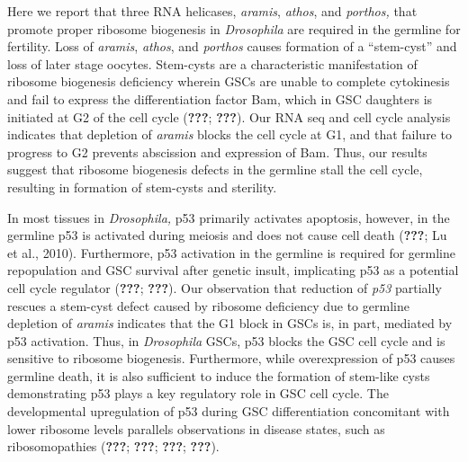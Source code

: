 \documentclass[12pt,oneside]{reedthesis}
\begin{document}
Here we report that three RNA helicases, \emph{aramis}, \emph{athos}, and \emph{porthos,} that promote proper ribosome biogenesis in \emph{Drosophila} are required in the germline for fertility. Loss of \emph{aramis}, \emph{athos}, and \emph{porthos} causes formation of a ``stem-cyst'' and loss of later stage oocytes. Stem-cysts are a characteristic manifestation of ribosome biogenesis deficiency wherein GSCs are unable to complete cytokinesis and fail to express the differentiation factor Bam, which in GSC daughters is initiated at G2 of the cell cycle ({\textbf{???}}; {\textbf{???}}). Our RNA seq and cell cycle analysis indicates that depletion of \emph{aramis} blocks the cell cycle at G1, and that failure to progress to G2 prevents abscission and expression of Bam. Thus, our results suggest that ribosome biogenesis defects in the germline stall the cell cycle, resulting in formation of stem-cysts and sterility.

In most tissues in \emph{Drosophila,} p53 primarily activates apoptosis, however, in the germline p53 is activated during meiosis and does not cause cell death ({\textbf{???}}; Lu et al., 2010). Furthermore, p53 activation in the germline is required for germline repopulation and GSC survival after genetic insult, implicating p53 as a potential cell cycle regulator ({\textbf{???}}; {\textbf{???}}). Our observation that reduction of \emph{p53} partially rescues a stem-cyst defect caused by ribosome deficiency due to germline depletion of \emph{aramis} indicates that the G1 block in GSCs is, in part, mediated by p53 activation. Thus, in \emph{Drosophila} GSCs, p53 blocks the GSC cell cycle and is sensitive to ribosome biogenesis. Furthermore, while overexpression of p53 causes germline death, it is also sufficient to induce the formation of stem-like cysts demonstrating p53 plays a key regulatory role in GSC cell cycle. The developmental upregulation of p53 during GSC differentiation concomitant with lower ribosome levels parallels observations in disease states, such as ribosomopathies ({\textbf{???}}; {\textbf{???}}; {\textbf{???}}; {\textbf{???}}).
\end{document}
